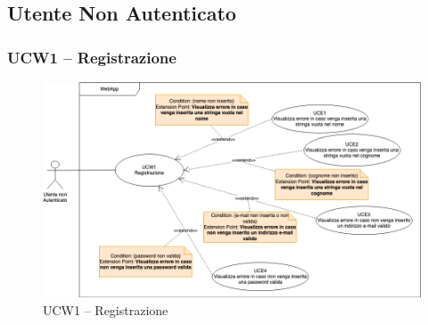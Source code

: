 \subsection{Utente Non Autenticato}
\subsubsection{UCW1 – Registrazione}
\begin{figure}[!h]
\centering
\includegraphics[scale=0.5]{UC_images/UCW1.png}
\caption{UCW1 – Registrazione}
\end{figure}
